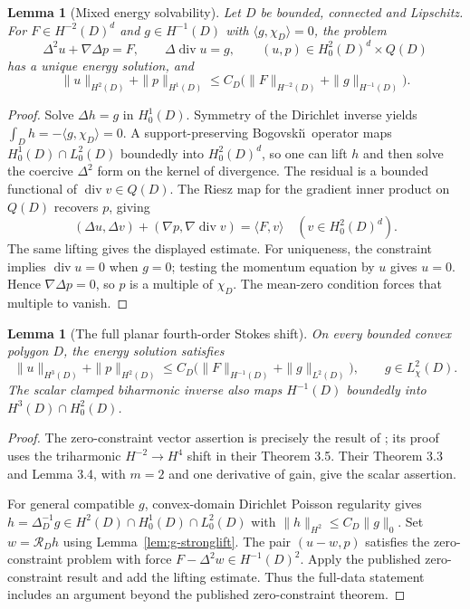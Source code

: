 \documentclass[11pt,a4paper]{article}
\newtheorem{lemma}[theorem]{Lemma}
\theoremstyle{remark}
\numberwithin{equation}{section}
\begin{document}
\begin{lemma}[Mixed energy solvability]\label{lem:g-energy}
Let $D$ be bounded, connected and Lipschitz. For $F\in H^{-2}(D)^d$ and
$g\in H^{-1}(D)$ with $\langle g,\chi_D\rangle=0$, the problem
\[
 \Delta^2u+\nabla\Delta p=F,\qquad
 \Delta\operatorname{div}u=g,
 \qquad (u,p)\in H^2_0(D)^d\times Q(D)
\]
has a unique energy solution, and
\[
 \|u\|_{H^2(D)}+\|p\|_{H^1(D)}
 \le C_D\bigl(\|F\|_{H^{-2}(D)}+\|g\|_{H^{-1}(D)}\bigr).
\]
\end{lemma}
\begin{proof}
Solve $\Delta h=g$ in $H^1_0(D)$. Symmetry of the Dirichlet inverse yields
$\int_D h=-\langle g,\chi_D\rangle=0$. A support-preserving Bogovski\u\i\
operator maps $H^1_0(D)\cap L^2_0(D)$ boundedly into $H^2_0(D)^d$, so one can
lift $h$ and then solve the coercive $\Delta^2$ form on the kernel of
divergence. The residual is a bounded functional of
$\operatorname{div}v\in Q(D)$. The Riesz map for the gradient inner product
on $Q(D)$ recovers $p$, giving
\[
 (\Delta u,\Delta v)+(\nabla p,\nabla\operatorname{div}v)
 =\langle F,v\rangle\quad(v\in H^2_0(D)^d).
\]
The same lifting gives the displayed estimate. For uniqueness, the constraint
implies $\operatorname{div}u=0$ when $g=0$; testing the momentum equation by
$u$ gives $u=0$. Hence $\nabla\Delta p=0$, so $p$ is a multiple of
$\chi_D$. The mean-zero condition forces that multiple to vanish.
\end{proof}

\begin{lemma}[The full planar fourth-order Stokes shift]\label{lem:g-planarstokes}
On every bounded convex polygon $D$, the energy solution satisfies
\[
 \|u\|_{H^3(D)}+\|p\|_{H^2(D)}
 \le C_D\bigl(\|F\|_{H^{-1}(D)}+\|g\|_{L^2(D)}\bigr),
 \qquad g\in L^2_\chi(D).
\]
The scalar clamped biharmonic inverse also maps $H^{-1}(D)$ boundedly into
$H^3(D)\cap H^2_0(D)$.
\end{lemma}
\begin{proof}
The zero-constraint vector assertion is precisely the result of
\cite[Theorem 3.6]{CHH2023}; its proof uses the triharmonic
$H^{-2}\to H^4$ shift in their Theorem 3.5. Their Theorem 3.3 and Lemma 3.4,
with $m=2$ and one derivative of gain, give the scalar assertion.

For general compatible $g$, convex-domain Dirichlet Poisson regularity \cite{Grisvard1985} gives
$h=\Delta_D^{-1}g\in H^2(D)\cap H^1_0(D)\cap L^2_0(D)$ with
$\|h\|_{H^2}\le C_D\|g\|_0$. Set $w=\mathcal R_Dh$ using
Lemma~\ref{lem:g-stronglift}. The pair $(u-w,p)$ satisfies the zero-constraint
problem with force $F-\Delta^2w\in H^{-1}(D)^2$. Apply the published
zero-constraint result and add the lifting estimate. Thus the full-data
statement includes an argument beyond the published zero-constraint theorem.
\end{proof}
\end{document}
